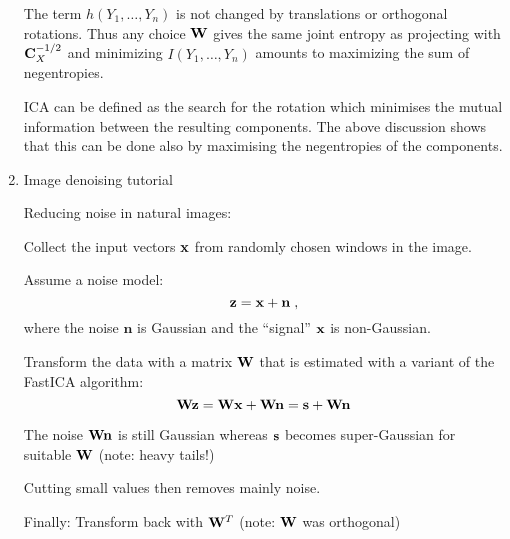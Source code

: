 \begin{enumerate}
\begin{solution}
    The term $h(Y_1, \ldots, Y_n)$ is not changed by translations or orthogonal rotations.
    Thus any choice ${ \bf W}$ gives the same joint entropy as projecting with ${\bf C}_X^{-1/2}$
    and minimizing $I(Y_1, \ldots, Y_n)$ amounts to maximizing the sum of negentropies.

    ICA can be defined as the search for the rotation which minimises
    the mutual information between the resulting components.  The above
    discussion shows that this can be done also by
    maximising the negentropies of the components.

  \end{solution}
  
\item Image denoising tutorial

  \begin{solution}

    Reducing noise in natural images:

    Collect the input vectors ${\bf x}$ from randomly chosen windows in the
    image.

    Assume a noise model:
    \begin{displaymath}
      {\bf z} = {\bf x} + \mathbf{n} \; ,
    \end{displaymath}
    where the noise $\mathbf{n}$ is Gaussian and the ``signal'' ${\bf x}$ is
    non-Gaussian.

    Transform the data with a matrix ${\bf W}$ that is estimated with a variant 
    of the FastICA algorithm:
    \begin{displaymath}
      {\bf Wz} = {\bf Wx} + {\bf Wn} = {\bf s} + {\bf Wn}
    \end{displaymath}

    The noise ${\bf Wn}$ is still Gaussian whereas ${\bf s}$ becomes
    super-Gaussian for suitable ${\bf W}$ (note: heavy tails!)

    Cutting small values then removes mainly noise.

    Finally: Transform back with ${\bf W}^T$ (note: ${\bf W}$ was orthogonal)

    
  \end{solution}

  

\end{enumerate}


